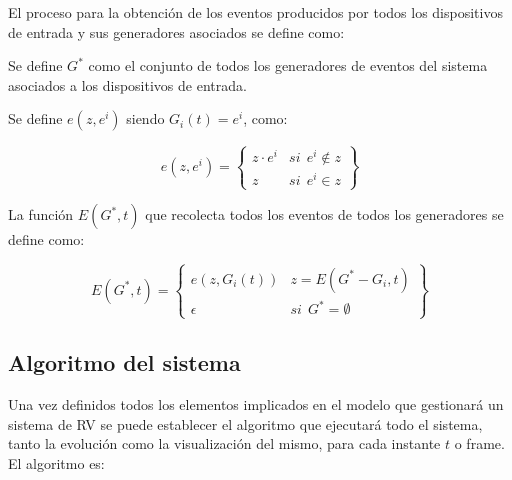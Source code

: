 \documentclass{egpubl}
\begin{document}
El proceso para la obtenci\'on de los eventos producidos por todos los
dispositivos de entrada y sus generadores asociados se define como:

\begin{itshape}
Se define $G^{*}$ como el conjunto de todos los generadores de
eventos del sistema asociados a los dispositivos de entrada.

Se define $e(z, e^{i})$ siendo $G_{i}(t) = e^{i}$, como:

\[
	e(z, e^{i}) = \left\{
	\begin{matrix}
		z \cdot e^{i}   &   \mathit{si} \ \ e^{i} \notin z \\
		z    &   \mathit{si} \ \ e^{i} \in z
	\end{matrix}
\right\}\]


La funci\'on $E(G^{*},t)$ que recolecta todos los eventos
de todos los generadores se define como:

\[
	E(G^{*}, t) = \left\{
	\begin{matrix}
		e(z, G_{i}(t))   &   z = E(G^{*} - G_{i}, t) \\
		\epsilon   &  \mathit{si} \ \ G^{*} = \emptyset 
	\end{matrix}
\right\}\]


\end{itshape}



\subsection{Algoritmo del sistema
\label{sec:algoritmo_sistema}}

Una vez definidos todos los elementos implicados en el modelo que
gestionar\'a un sistema de RV se puede establecer el algoritmo que
ejecutar\'a todo el sistema, tanto la evoluci\'on como la
visualizaci\'on del mismo, para cada instante $t$ o frame. El
algoritmo es:
\end{document}
